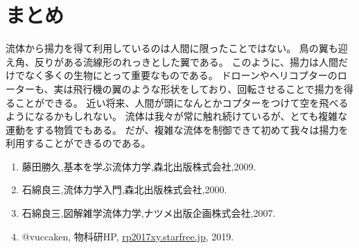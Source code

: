\documentclass[10pt,b5paper,papersize,dvipdfmx]{jsbook}
\begin{document}
\section{まとめ}
流体から揚力を得て利用しているのは人間に限ったことではない。
鳥の翼も迎え角、反りがある流線形のれっきとした翼である。
このように、揚力は人間だけでなく多くの生物にとって重要なものである。
ドローンやヘリコプターのローターも、実は飛行機の翼のような形状をしており、回転させることで揚力を得ることができる。
近い将来、人間が頭になんとかコプターをつけて空を飛べるようになるかもしれない。
流体は我々が常に触れ続けているが、とても複雑な運動をする物質でもある。
だが、複雑な流体を制御できて初めて我々は揚力を利用することができるのである。
\clearpage
\begin{sanko}
  \begin{enumerate}
    \item 藤田勝久,基本を学ぶ流体力学,森北出版株式会社,2009.
    \item 石綿良三,流体力学入門,森北出版株式会社,2000.
    \item 石綿良三,図解雑学流体力学,ナツメ出版企画株式会社,2007.
    \item @vuccaken, 物科研HP, \url{rp2017xy.starfree.jp}, 2019.
  \end{enumerate}
\end{sanko}
\end{document}
